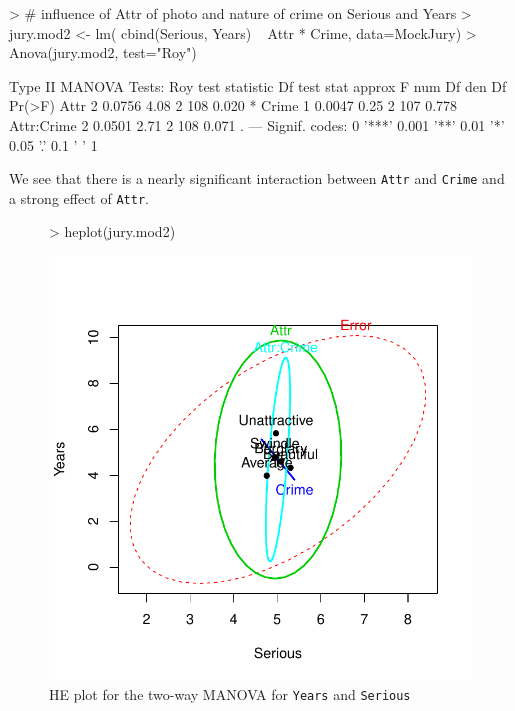 \documentclass[11pt]{article}
\newcommand{\code}[1]{{\texttt{#1}}}
\begin{document}
\begin{Schunk}
\begin{Sinput}
> # influence of Attr of photo and nature of crime on Serious and Years
> jury.mod2 <- lm( cbind(Serious, Years) ~ Attr * Crime, data=MockJury)
> Anova(jury.mod2, test="Roy")
\end{Sinput}
\begin{Soutput}
Type II MANOVA Tests: Roy test statistic
           Df test stat approx F num Df den Df Pr(>F)  
Attr        2    0.0756     4.08      2    108  0.020 *
Crime       1    0.0047     0.25      2    107  0.778  
Attr:Crime  2    0.0501     2.71      2    108  0.071 .
---
Signif. codes:  0 '***' 0.001 '**' 0.01 '*' 0.05 '.' 0.1 ' ' 1 
\end{Soutput}
\end{Schunk}
We see that there is a nearly significant  interaction between \code{Attr} and \code{Crime}
and a strong effect of \code{Attr}.

\begin{figure}[htb]
\begin{center}
\begin{Schunk}
\begin{Sinput}
> heplot(jury.mod2)
\end{Sinput}
\end{Schunk}
\includegraphics{fig/plot-jury-mod2-HE}
\caption{HE plot for the two-way MANOVA for \code{Years} and \code{Serious}}
\label{fig:jury-mod2-HE}
\end{center}
\end{figure}
\end{document}
